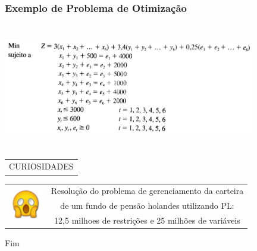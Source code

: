 \documentclass{beamer}
\begin{document}
\begin{frame}
	\frametitle{Exemplo de Problema de Otimização}
	{
		\includegraphics[width=11cm,height=5.5cm]{exemplo.png}
	}
	\only<2>
	{
		\begin{table}
			\begin{tabular}{c}
				\Large \color{blue} CURIOSIDADES
			\end{tabular}
			\begin{tabular}{c c}
				\multirow{3}{*}{ \includegraphics[width=1.5cm,height=1.5cm]{horror.jpg} } 
								     & \cellcolor{green} Resolução do problema de gerenciamento da carteira \\
									 & \cellcolor{green} de um fundo de pensão holandes utilizando PL: \\
						             & \cellcolor{green} 12,5 milhoes de restrições e 25 milhões de variáveis \\
			\end{tabular}
		\end{table}
	}
\end{frame}

\begin{frame}
\Huge{\centerline{Fim}}
\end{frame}

\end{document}
